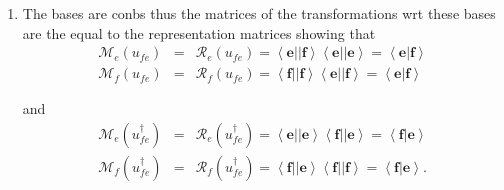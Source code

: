 \documentclass[aps,preprint]{revtex4}
\begin{document}
\begin{enumerate}
\item The bases are conbs thus the matrices of the transformations wrt these
bases are the equal to the representation matrices showing that 
\begin{eqnarray}
\mathcal{M}_{e}\left( u_{fe}\right) &=&\mathcal{R}_{e}\left( u_{fe}\right)
=\left\langle \boldsymbol{e}\right\vert \left\vert \boldsymbol{f}%
\right\rangle \left\langle \boldsymbol{e}\right\vert \left\vert \boldsymbol{e%
}\right\rangle =\left\langle \left. \boldsymbol{e}\right\vert \boldsymbol{f}%
\right\rangle \\
\mathcal{M}_{f}\left( u_{fe}\right) &=&\mathcal{R}_{f}\left( u_{fe}\right)
=\left\langle \boldsymbol{f}\right\vert \left\vert \boldsymbol{f}%
\right\rangle \left\langle \boldsymbol{e}\right\vert \left\vert \boldsymbol{f%
}\right\rangle =\left\langle \left. \boldsymbol{e}\right\vert \boldsymbol{f}%
\right\rangle
\end{eqnarray}

and 
\begin{eqnarray}
\mathcal{M}_{e}\left( u_{fe}^{\dagger }\right) &=&\mathcal{R}_{e}\left(
u_{fe}^{\dagger }\right) =\left\langle \boldsymbol{e}\right\vert \left\vert 
\boldsymbol{e}\right\rangle \left\langle \boldsymbol{f}\right\vert
\left\vert \boldsymbol{e}\right\rangle =\left\langle \left. \boldsymbol{f}%
\right\vert \boldsymbol{e}\right\rangle \\
\mathcal{M}_{f}\left( u_{fe}^{\dagger }\right) &=&\mathcal{R}_{f}\left(
u_{fe}^{\dagger }\right) =\left\langle \boldsymbol{f}\right\vert \left\vert 
\boldsymbol{e}\right\rangle \left\langle \boldsymbol{f}\right\vert
\left\vert \boldsymbol{f}\right\rangle =\left\langle \left. \boldsymbol{f}%
\right\vert \boldsymbol{e}\right\rangle .
\end{eqnarray}


\end{enumerate}
\end{document}
